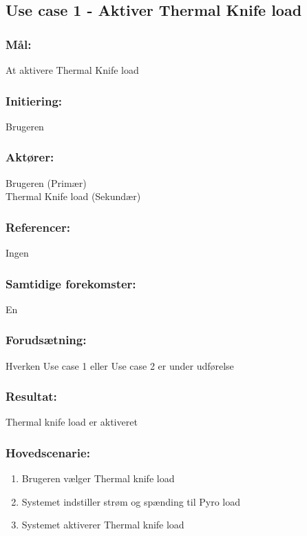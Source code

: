 \begin{framed}
	\subsection{Use case 1 - Aktiver Thermal Knife load}
	\subsubsection*{Mål:}
	At aktivere Thermal Knife load
	
	\subsubsection*{Initiering:}
	Brugeren
	
	\subsubsection*{Aktører:}
	Brugeren (Primær)\\ \indent
	Thermal Knife load (Sekundær)
	
	\subsubsection*{Referencer:}
	Ingen
	
	\subsubsection*{Samtidige forekomster:}
	En
	
	\subsubsection*{Forudsætning:}
	Hverken Use case 1 eller Use case 2 er under udførelse
	
	
	\subsubsection*{Resultat:}
	Thermal knife load er aktiveret
	
	
	\subsubsection*{Hovedscenarie:}
	\begin{enumerate}
		\item Brugeren vælger Thermal knife load
		\item Systemet indstiller strøm og spænding til Pyro load
		\item Systemet aktiverer Thermal knife load
	\end{enumerate}
	
\end{framed}

